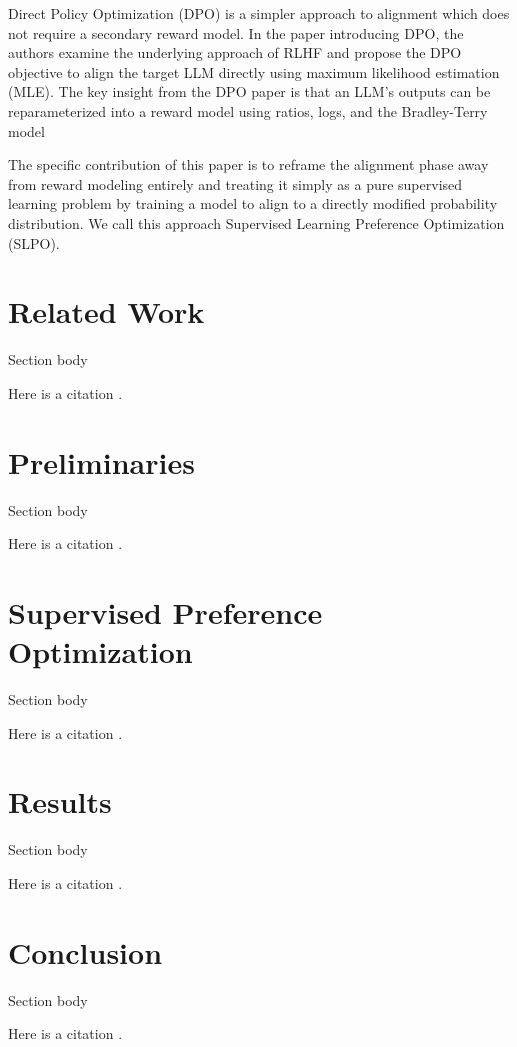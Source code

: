 \documentclass[twoside,11pt]{article}
\begin{document}
Direct Policy Optimization (DPO) is a simpler approach to alignment
which does not require a secondary reward model. In the paper introducing
DPO, the authors examine the underlying
approach of RLHF and propose
the DPO objective to align the target LLM directly using
maximum likelihood estimation (MLE). 
The key insight from the DPO paper is that an LLM's
outputs can be reparameterized into a reward model using ratios, logs,
and the Bradley-Terry model \cite{bradley1952rank}

The specific contribution of this paper is to reframe the alignment
phase away from reward modeling entirely and treating it simply as
a pure supervised learning problem by training a model to align to
a directly modified probability distribution. We call this
approach Supervised Learning Preference Optimization (SLPO).

\section{Related Work}

Section body

Here is a citation \cite{chow:68}.

\section{Preliminaries}

Section body

Here is a citation \cite{chow:68}.

\section{Supervised Preference Optimization}

Section body

Here is a citation \cite{chow:68}.

\section{Results}

Section body

Here is a citation \cite{chow:68}.

\section{Conclusion}

Section body

Here is a citation \cite{chow:68}.
\end{document}
